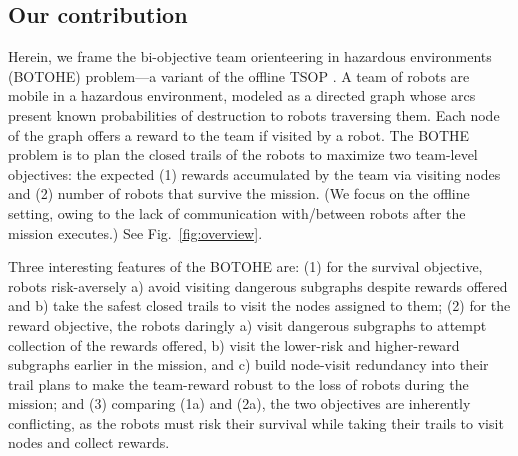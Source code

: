 \documentclass[11pt, oneside]{article}
\begin{document}
\subsection{Our contribution}
Herein, we frame the bi-objective team orienteering in hazardous environments (BOTOHE) problem---a variant of the offline TSOP \cite{jorgensen2018team,jorgensen2017matroid,jorgensen2024matroid}.
A team of robots are mobile in a hazardous environment, modeled as a directed graph whose arcs present known probabilities of destruction to robots traversing them.
Each node of the graph offers a reward to the team if visited by a robot.
The BOTHE problem is to plan the closed trails of the robots to maximize two team-level objectives: the expected
(1) rewards accumulated by the team via visiting nodes and
(2) number of robots that survive the mission. 
(We focus on the offline setting, owing to the lack of communication with/between robots after the mission executes.)
See Fig.~\ref{fig:overview}.

Three interesting features of the BOTOHE are: 
(1) for the survival objective, robots risk-aversely a) avoid visiting dangerous subgraphs despite rewards offered and b) take the safest closed trails to visit the nodes assigned to them;
(2) for the reward objective, the robots daringly a) visit dangerous subgraphs to attempt collection of the rewards offered, b) visit the lower-risk and higher-reward subgraphs earlier in the mission, and c) build node-visit redundancy into their trail plans to make the team-reward robust to the loss of robots during the mission; and
(3) comparing (1a) and (2a), the two objectives are inherently conflicting, as the robots must risk their survival while taking their trails to visit nodes and collect rewards.%
\end{document}
